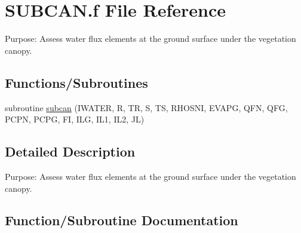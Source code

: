 \hypertarget{SUBCAN_8f}{}\section{S\+U\+B\+C\+A\+N.\+f File Reference}
\label{SUBCAN_8f}


Purpose\+: Assess water flux elements at the ground surface under the vegetation canopy.  


\subsection*{Functions/\+Subroutines}
\begin{DoxyCompactItemize}
\item 
subroutine \hyperlink{SUBCAN_8f_a7821b148b27a4db899e0cdf8ece2379a}{subcan} (I\+W\+A\+T\+E\+R, R, T\+R, S, T\+S, R\+H\+O\+S\+N\+I, E\+V\+A\+P\+G, Q\+F\+N, Q\+F\+G, P\+C\+P\+N, P\+C\+P\+G, F\+I, I\+L\+G, I\+L1, I\+L2, J\+L)
\end{DoxyCompactItemize}


\subsection{Detailed Description}
Purpose\+: Assess water flux elements at the ground surface under the vegetation canopy. 



\subsection{Function/\+Subroutine Documentation}
\hypertarget{SUBCAN_8f_a7821b148b27a4db899e0cdf8ece2379a}{}
